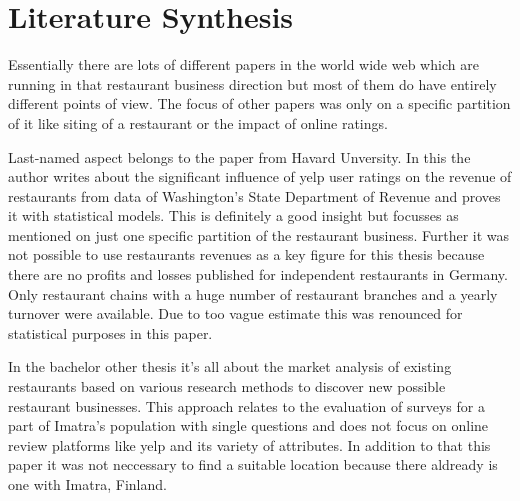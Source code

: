 \section{Literature Synthesis}
\label{sec:synthesis}
Essentially there are lots of different papers in the world wide web which are running in that restaurant business direction but most of them do have entirely different points of view. The focus of other papers was only on a specific partition of it like siting of a restaurant or the impact of online ratings. 

Last-named aspect belongs to the paper from Havard Unversity\cite{CaseOfYelp}. In this the author writes about the significant influence of yelp user ratings on the revenue of restaurants from data of Washington’s State Department of Revenue and proves it with statistical models. This is definitely a good insight but focusses as mentioned on just one specific partition of the restaurant business. Further it was not possible to use restaurants revenues as a key figure for this thesis because there are no profits and losses published for independent restaurants in Germany. Only restaurant chains with a huge number of restaurant branches and a yearly turnover were available. Due to too vague estimate this was renounced for statistical purposes in this paper.

In the bachelor other thesis \cite{Imatra} it's all about the market analysis of existing restaurants based on various research methods to discover new possible restaurant businesses. This approach relates to the evaluation of surveys for a part of Imatra's population with single questions and does not focus on online review platforms like yelp and its variety of attributes. In addition to that this paper it was not neccessary to find a suitable location because there aldready is one with Imatra, Finland.